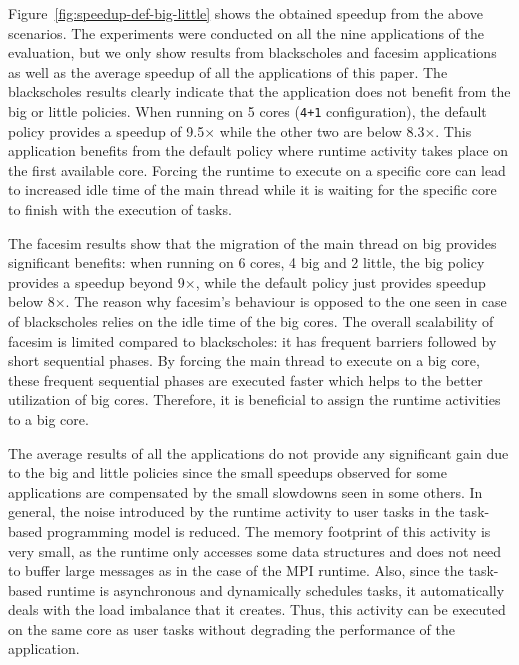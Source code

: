 Figure~\ref{fig:speedup-def-big-little} shows the obtained speedup from the above scenarios. 
The experiments were conducted on all the nine applications of the evaluation, but we only show results from blackscholes and facesim applications as well as the average speedup of all the applications of this paper.
The blackscholes results clearly indicate that the application does not benefit from the big or little policies.                                                                                                   
When running on 5 cores (\texttt{4+1} configuration), the default policy provides a speedup of 9.5$\times$ while the other two are below 8.3$\times$.                                                                                                               
This application benefits from the default policy where runtime activity takes place on the first available core.
Forcing the runtime to execute on a specific core can lead to increased idle time of the main thread while it is waiting for the specific core to finish with the execution of tasks.

The facesim results show that the migration of the main thread on big provides significant benefits: when running on 6 cores, 4 big and 2 little, the big policy provides a speedup beyond 9$\times$, while the default policy just provides speedup below 8$\times$.
The reason why facesim's behaviour is opposed to the one seen in case of blackscholes relies on the idle time of the big cores.                                                                                                              
The overall scalability of facesim is limited compared to blackscholes: it has frequent barriers followed by short sequential phases. 
By forcing the main thread to execute on a big core, these frequent sequential phases are executed faster which helps to the better utilization of big cores.
Therefore, it is beneficial to assign the runtime activities to a big core.


The average results of all the applications do not provide any significant gain due to the big and little policies since the small speedups observed for some applications are compensated by the small slowdowns seen in some others. In general, the noise introduced by the runtime activity to user tasks in the task-based programming model is reduced. The memory footprint of this activity is very small, as the runtime only accesses some data structures and does not need to buffer large messages as in the case of the MPI runtime. Also, since the task-based runtime is asynchronous and dynamically schedules tasks, it automatically deals with the load imbalance that it creates. Thus, this activity can be executed on the same core as user tasks without degrading the performance of the application.


